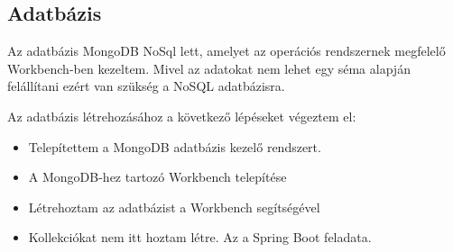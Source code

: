 \subsection{Adatbázis}
Az adatbázis MongoDB NoSql lett, amelyet az operációs rendszernek megfelelő Workbench-ben kezeltem. Mivel az adatokat nem lehet egy séma alapján felállítani ezért van szükség a NoSQL adatbázisra.

Az adatbázis létrehozásához a következő lépéseket végeztem el:
\begin{itemize}
	\item Telepítettem a MongoDB adatbázis kezelő rendszert.
	\item A MongoDB-hez tartozó Workbench telepítése
	\item Létrehoztam az adatbázist a Workbench segítségével
	\item Kollekciókat nem itt hoztam létre. Az a Spring Boot feladata.
\end{itemize}